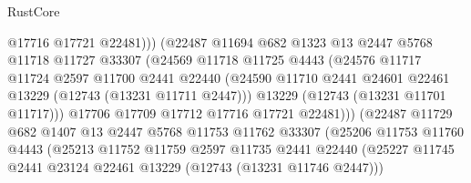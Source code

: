 \begin{lexlean}{RustCore}
\begin{coremodule}
                                  @17716
                                  @17721
                                  @22481)))
                            (@22487
                              @11694
                              @682
                              @1323
                              @13
                              @2447
                              @5768
                              @11718
                              @11727
                              @33307
                              (@24569
                                @11718
                                @11725
                                @4443
                                (@24576
                                  @11717
                                  @11724
                                  @2597
                                  @11700
                                  @2441
                                  @22440
                                  (@24590
                                    @11710
                                    @2441
                                    @24601
                                    @22461
                                    @13229
                                    (@12743 (@13231 @11711 @2447)))
                                  @13229
                                  (@12743 (@13231 @11701 @11717)))
                                @17706
                                @17709
                                @17712
                                @17716
                                @17721
                                @22481)))
                          (@22487
                            @11729
                            @682
                            @1407
                            @13
                            @2447
                            @5768
                            @11753
                            @11762
                            @33307
                            (@25206
                              @11753
                              @11760
                              @4443
                              (@25213
                                @11752
                                @11759
                                @2597
                                @11735
                                @2441
                                @22440
                                (@25227
                                  @11745
                                  @2441
                                  @23124
                                  @22461
                                  @13229
                                  (@12743 (@13231 @11746 @2447)))

\end{coremodule}
\end{lexlean}
